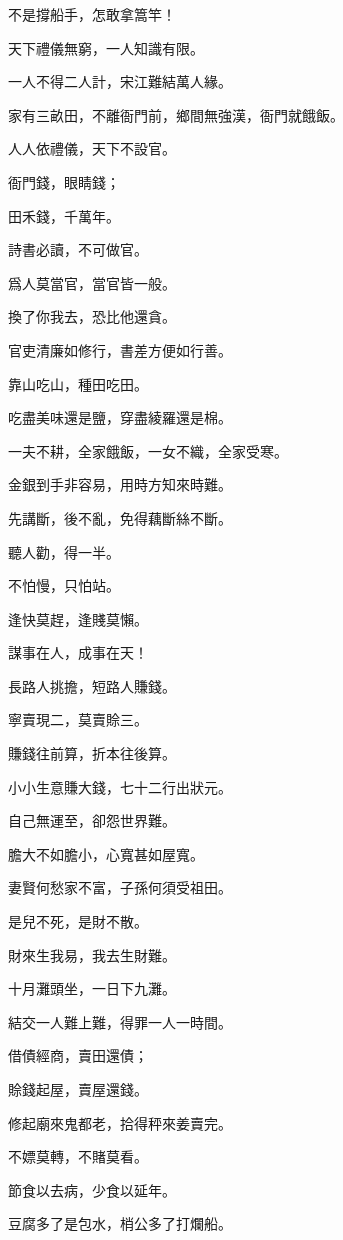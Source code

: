 \documentclass[12pt,a4paper]{ctexbook}
\begin{document}
不是撐船手，怎敢拿篙竿！\par
天下禮儀無窮，一人知識有限。\par
一人不得二人計，宋江難結萬人緣。\par
家有三畝田，不離衙門前，鄉間無強漢，衙門就餓飯。\par
人人依禮儀，天下不設官。\par
衙門錢，眼睛錢；\par
田禾錢，千萬年。\par
詩書必讀，不可做官。\par
爲人莫當官，當官皆一般。\par
換了你我去，恐比他還貪。\par
官吏清廉如修行，書差方便如行善。\par
靠山吃山，種田吃田。\par
吃盡美味還是鹽，穿盡綾羅還是棉。\par
一夫不耕，全家餓飯，一女不織，全家受寒。\par
金銀到手非容易，用時方知來時難。\par
先講斷，後不亂，免得藕斷絲不斷。\par
聽人勸，得一半。\par
不怕慢，只怕站。\par
逢快莫趕，逢賤莫懶。\par
謀事在人，成事在天！\par
長路人挑擔，短路人賺錢。\par
寧賣現二，莫賣賒三。\par
賺錢往前算，折本往後算。\par
小小生意賺大錢，七十二行出狀元。\par
自己無運至，卻怨世界難。\par
膽大不如膽小，心寬甚如屋寬。\par
妻賢何愁家不富，子孫何須受祖田。\par
是兒不死，是財不散。\par
財來生我易，我去生財難。\par
十月灘頭坐，一日下九灘。\par
結交一人難上難，得罪一人一時間。\par
借債經商，賣田還債；\par
賒錢起屋，賣屋還錢。\par
修起廟來鬼都老，拾得秤來姜賣完。\par
不嫖莫轉，不賭莫看。\par
節食以去病，少食以延年。\par
豆腐多了是包水，梢公多了打爛船。\par
\end{document}
